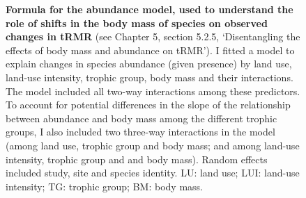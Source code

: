 \vspace{2cm}


\begin{figure}[h!]
\centering
{}

\caption[Formula for the abundance model, used to understand the role of shifts in the body mass of species on observed changes in tRMR]{\textbf{Formula for the abundance model, used to understand the role of shifts in the body mass of species on observed changes in tRMR} (see Chapter 5, section 5.2.5, `Disentangling the effects of body mass and abundance on tRMR'). I fitted a model to explain changes in species abundance (given presence) by land use, land-use intensity, trophic group, body mass and their interactions. The model included all two-way interactions among these predictors. To account for potential differences in the slope of the relationship between abundance and body mass among the different trophic groups, I also included two three-way interactions in the model (among land use, trophic group and body mass; and among land-use intensity, trophic group and and body mass). Random effects included study, site and species identity. LU: land use; LUI: land-use intensity; TG: trophic group; BM: body mass.}
\label{SI5_figure1}
\end{figure}


